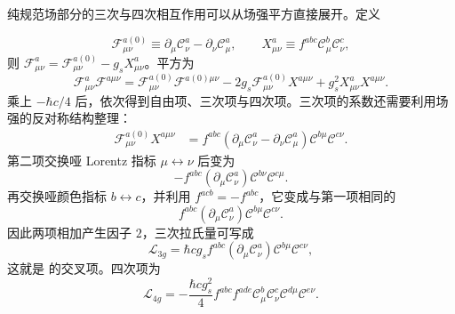 \begin{derivation}[场强平方中的三胶子与四胶子项]
纯规范场部分的三次与四次相互作用可以从场强平方直接展开。定义

\begin{equation*}
\mathcal F_{\mu\nu}^{a(0)}\equiv
\partial_\mu\mathscr C_\nu^a-\partial_\nu\mathscr C_\mu^a,
\qquad
X_{\mu\nu}^a\equiv f^{abc}\mathscr C_\mu^b\mathscr C_\nu^c,
\end{equation*}
则 $\mathcal F_{\mu\nu}^a=\mathcal F_{\mu\nu}^{a(0)}-g_sX_{\mu\nu}^a$。平方为
\begin{equation*}
\mathcal F_{\mu\nu}^a\mathcal F^{a\mu\nu}
=\mathcal F_{\mu\nu}^{a(0)}\mathcal F^{a(0)\mu\nu}
-2g_s\mathcal F_{\mu\nu}^{a(0)}X^{a\mu\nu}
+g_s^2X_{\mu\nu}^aX^{a\mu\nu}.
\end{equation*}
乘上 $-\hbar c/4$ 后，依次得到自由项、三次项与四次项。三次项的系数还需要利用场强的反对称结构整理：
\begin{align*}
\mathcal F_{\mu\nu}^{a(0)}X^{a\mu\nu}
&=f^{abc}(\partial_\mu\mathscr C_\nu^a-\partial_\nu\mathscr C_\mu^a)
\mathscr C^{b\mu}\mathscr C^{c\nu}.
\end{align*}
第二项交换哑 Lorentz 指标 $\mu\leftrightarrow\nu$ 后变为
\begin{equation*}
-f^{abc}(\partial_\mu\mathscr C_\nu^a)
\mathscr C^{b\nu}\mathscr C^{c\mu}.
\end{equation*}
再交换哑颜色指标 $b\leftrightarrow c$，并利用 $f^{acb}=-f^{abc}$，它变成与第一项相同的
\begin{equation*}
f^{abc}(\partial_\mu\mathscr C_\nu^a)
\mathscr C^{b\mu}\mathscr C^{c\nu}.
\end{equation*}
因此两项相加产生因子 $2$，三次拉氏量可写成
\begin{equation*}
\mathcal L_{3g}
=\hbar c g_s f^{abc}(\partial_\mu\mathscr C_\nu^a)
\mathscr C^{b\mu}\mathscr C^{c\nu},
\end{equation*}
这就是 的交叉项。四次项为
\begin{equation*}
\mathcal L_{4g}
=-\frac{\hbar c g_s^2}{4}
 f^{abc}f^{ade}
 \mathscr C_\mu^b\mathscr C_\nu^c
 \mathscr C^{d\mu}\mathscr C^{e\nu}.
\end{equation*}

\end{derivation}
